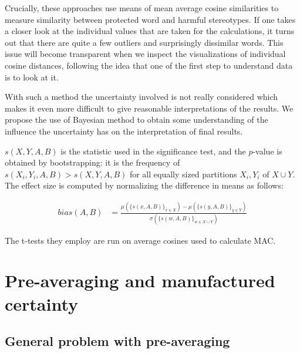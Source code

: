 \documentclass[
  10pt,
  dvipsnames,enabledeprecatedfontcommands, twocolumn]{scrartcl}
\begin{document}
Crucially, these approaches use means of mean average cosine
similarities to measure similarity between protected word and harmful
stereotypes. If one takes a closer look at the individual values that
are taken for the calculations, it turns out that there are quite a few
outliers and surprisingly dissimilar words. This issue will become
transparent when we inspect the visualizations of individual cosine
distances, following the idea that one of the first step to understand
data is to look at it.

With such a method the uncertainty involved is not really considered
which makes it even more difficult to give reasonable interpretations of
the results. We propose the use of Bayesian method to obtain some
understanding of the influence the uncertainty has on the interpretation
of final results.



\noindent \(s(X,Y,A,B)\) is the statistic used in the significance test,
and the \(p\)-value is obtained by bootstrapping: it is the frequency of
\(s(X_i,Y_i,A,B)>s(X,Y,A,B)\) for all equally sized partitions
\(X_i, Y_i\) of \(X\cup Y\). The effect size is computed by normalizing
the difference in means as follows:

\vspace{-2mm}

\footnotesize

\begin{align}
bias(A,B) & = \frac{
\mu(\{s(x,A,B)\}_{x\in X}) -\mu(\{s(y,A,B)\}_{y\in Y}) 
}{
\sigma(\{s(w,A,B)\}_{w\in X\cup Y})
}
\end{align}

\normalsize

The t-tests they employ are run on average cosines used to calculate
MAC.

\hypertarget{pre-averaging-and-manufactured-certainty}{%
\section{Pre-averaging and manufactured
certainty}\label{pre-averaging-and-manufactured-certainty}}

\hypertarget{general-problem-with-pre-averaging}{%
\subsection{General problem with
pre-averaging}\label{general-problem-with-pre-averaging}}
\end{document}
